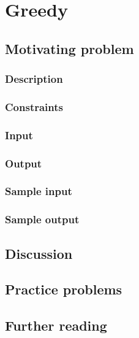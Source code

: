 \section{Greedy}

\subsection*{Motivating problem}

\subsubsection*{Description}

\subsubsection*{Constraints}

\subsubsection*{Input}

\subsubsection*{Output}

\subsubsection*{Sample input}

\subsubsection*{Sample output}

\subsection*{Discussion}

\subsection*{Practice problems}

\subsection*{Further reading}
